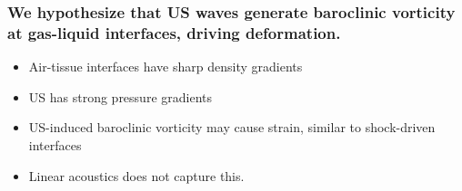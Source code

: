 \begin{frame} \frametitle{\vspace*{0.5cm}We hypothesize that US waves generate baroclinic vorticity at gas-liquid interfaces, driving deformation.}%
  \begin{minipage}{\textwidth}
    \begin{minipage}{0.5\textwidth}
      {\footnotesize
        \begin{itemize}%
        \item Air-tissue interfaces have sharp density gradients%
          \vspace*{6pt}%
        \item US has strong pressure gradients%
          \vspace*{6pt}%
        \item US-induced baroclinic vorticity may cause strain, similar to shock-driven interfaces%
          \vspace*{6pt}%
        \item Linear acoustics does not capture this.
        \end{itemize}
      }
    \end{minipage}
    \begin{minipage}{0.5\textwidth}

\end{minipage}
\end{minipage}
\end{frame}
